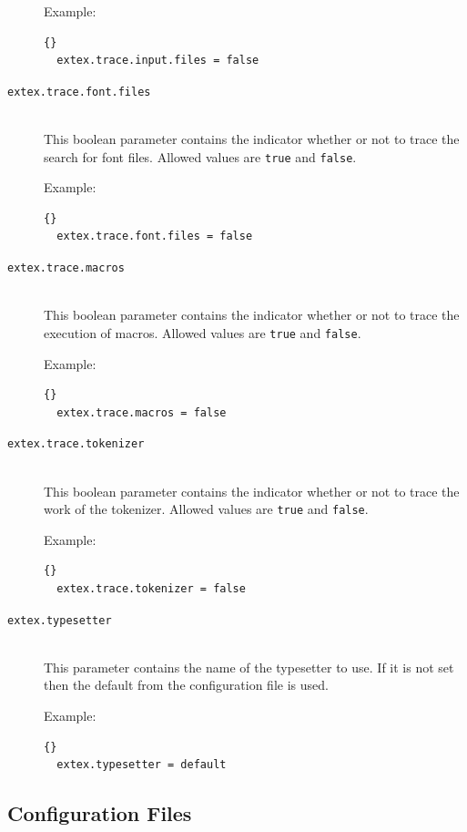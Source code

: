 \documentclass{extex-doc}
\makeatletter
\newcommand\Property[1]{\texttt{#1}\index{#1@\texttt{#1}}}
\makeatother
\begin{document}
\begin{description}
  Example:
\begin{lstlisting}{}
  extex.trace.input.files = false
\end{lstlisting}

\item[\Property{extex.trace.font.files}]\ \\
  This boolean parameter contains the indicator whether or not to
  trace the search for font files.  Allowed values are \verb|true| and
  \verb|false|.


  Example:
\begin{lstlisting}{}
  extex.trace.font.files = false
\end{lstlisting}

\item[\Property{extex.trace.macros}]\ \\
  This boolean parameter contains the indicator whether or not to
  trace the execution of macros.  Allowed values are \verb|true| and
  \verb|false|.

  Example:
\begin{lstlisting}{}
  extex.trace.macros = false
\end{lstlisting}

\item[\Property{extex.trace.tokenizer}]\ \\
  This boolean parameter contains the indicator whether or not to
  trace the work of the tokenizer.  Allowed values are \verb|true| and
  \verb|false|.

  Example:
\begin{lstlisting}{}
  extex.trace.tokenizer = false
\end{lstlisting}

\item[\Property{extex.typesetter}]\ \\
  This parameter contains the name of the typesetter to use. If it is
  not set then the default from the configuration file is used.

  Example:
\begin{lstlisting}{}
  extex.typesetter = default
\end{lstlisting}

\end{description}


\subsection{Configuration Files}
\end{document}
